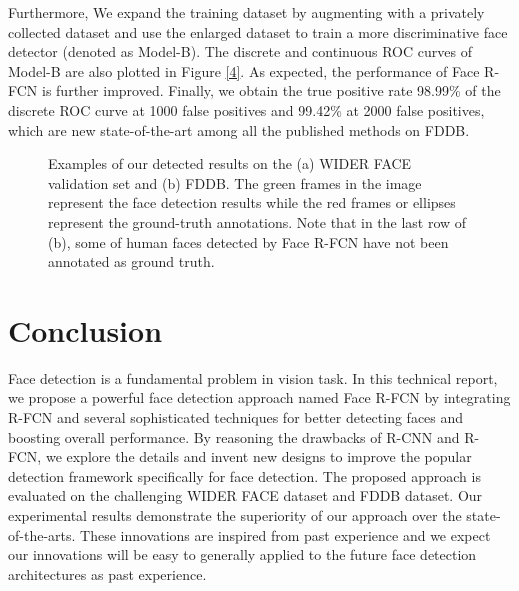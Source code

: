 \documentclass{article} \usepackage{nips13submit_e,times}
\begin{document}
Furthermore, We expand the training dataset by augmenting with a privately collected dataset and use the enlarged dataset to train a more discriminative face detector (denoted as Model-B). The discrete and continuous ROC curves of Model-B are also plotted in Figure \ref{4}. 
As expected, the performance of Face R-FCN is further improved. Finally, we obtain the true positive rate 98.99\% of the discrete ROC curve at 1000 false positives and 99.42\% at 2000 false positives, which are new state-of-the-art among all the published methods on FDDB.






\begin{figure*}
  \centering


  \caption{
Examples of our detected results on the (a) WIDER FACE validation set and (b) FDDB. The green frames in the image represent the face detection results while the red frames or ellipses represent the ground-truth annotations.
Note that in the last row of (b), some of human faces detected by Face R-FCN have not been annotated as ground truth.
    }\label{5}
\end{figure*}


\section{Conclusion}

Face detection is a fundamental problem in vision task.  
In this technical report, we propose a powerful face detection approach named Face R-FCN by integrating R-FCN and several sophisticated techniques for better detecting faces and boosting overall performance. By reasoning the drawbacks of R-CNN and R-FCN, we explore the details and invent new designs to improve the popular detection framework specifically for face detection. The proposed approach is evaluated on the challenging WIDER FACE dataset and FDDB dataset. Our experimental results demonstrate the superiority of our approach over the state-of-the-arts. These innovations are inspired from past experience and we expect our innovations will be easy to generally applied to the future face detection architectures as past experience. 




{\small


}
\end{document}
